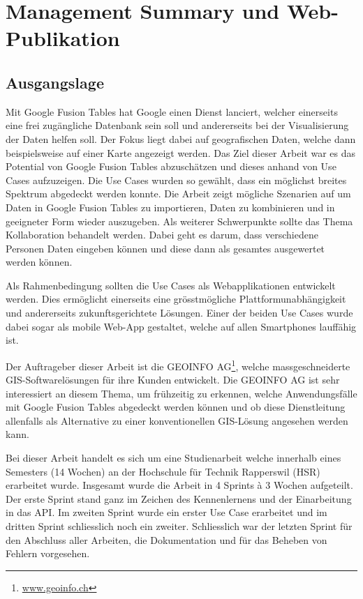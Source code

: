 \chapter*{Management Summary und Web-Publikation}
\thispagestyle{scrheadings}

\section*{Ausgangslage}
Mit Google Fusion Tables hat Google einen Dienst lanciert, welcher einerseits eine frei zugängliche Datenbank sein soll und andererseits bei der Visualisierung der Daten helfen soll. Der Fokus liegt dabei auf geografischen Daten, welche dann beispielsweise auf einer Karte angezeigt werden.
Das Ziel dieser Arbeit war es das Potential von Google Fusion Tables abzuschätzen und dieses anhand von Use Cases aufzuzeigen. Die Use Cases wurden so gewählt, dass ein möglichst breites Spektrum abgedeckt werden konnte. Die Arbeit zeigt mögliche Szenarien auf um Daten in Google Fusion Tables zu importieren, Daten zu kombinieren und in geeigneter Form wieder auszugeben. Als weiterer Schwerpunkte sollte das Thema Kollaboration behandelt werden. Dabei geht es darum, dass verschiedene Personen Daten eingeben können und diese dann als gesamtes ausgewertet werden können.

Als Rahmenbedingung sollten die Use Cases als Webapplikationen entwickelt werden. Dies ermöglicht einerseits eine grösstmögliche Plattformunabhängigkeit und andererseits zukunftsgerichtete Lösungen. Einer der beiden Use Cases wurde dabei sogar als mobile Web-App gestaltet, welche auf allen Smartphones lauffähig ist.

Der Auftrageber dieser Arbeit ist die GEOINFO AG\footnote{\url{www.geoinfo.ch}}, welche massgeschneiderte \gls{GIS}-Softwarelösungen für ihre Kunden entwickelt. Die GEOINFO AG ist sehr interessiert an diesem Thema, um frühzeitig zu erkennen, welche Anwendungsfälle mit Google Fusion Tables abgedeckt werden können und ob diese Dienstleitung allenfalls als Alternative zu einer konventionellen \gls{GIS}-Lösung angesehen werden kann.

Bei dieser Arbeit handelt es sich um eine Studienarbeit welche innerhalb eines Semesters (14 Wochen) an der Hochschule für Technik Rapperswil (HSR) erarbeitet wurde. Insgesamt wurde die Arbeit in 4 Sprints à 3 Wochen aufgeteilt. Der erste Sprint stand ganz im Zeichen des Kennenlernens und der Einarbeitung in das \gls{API}. Im zweiten Sprint wurde ein erster Use Case erarbeitet und im dritten Sprint schliesslich noch ein zweiter. Schliesslich war der letzten Sprint für den Abschluss aller Arbeiten, die Dokumentation und für das Beheben von Fehlern vorgesehen.

